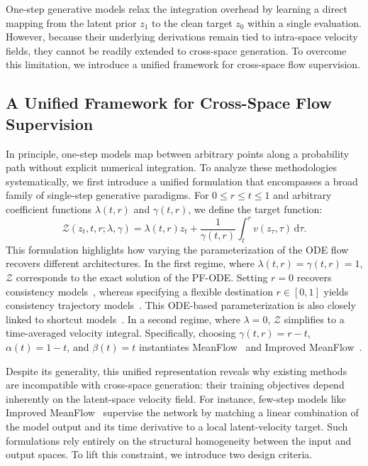 One-step generative models relax the integration overhead by learning a direct mapping from the latent prior $z_1$ to the clean target $z_0$ within a single evaluation. However, because their underlying derivations remain tied to intra-space velocity fields, they cannot be readily extended to cross-space generation. To overcome this limitation, we introduce a unified framework for cross-space flow supervision.

\subsection{A Unified Framework for Cross-Space Flow Supervision}

In principle, one-step models map between arbitrary points along a probability path without explicit numerical integration. To analyze these methodologies systematically, we first introduce a unified formulation that encompasses a broad family of single-step generative paradigms. For $0 \le r \le t \le 1$ and arbitrary coefficient functions $\lambda(t, r)$ and $\gamma(t, r)$, we define the target function:
\begin{equation}
\mathcal{Z}(z_t, t, r; \lambda, \gamma) = \lambda(t, r) z_t + \frac{1}{\gamma(t, r)} \int_{t}^{r} v(z_\tau, \tau)\,\mathrm{d}\tau.
\label{eq:general_z}
\end{equation}
This formulation highlights how varying the parameterization of the ODE flow recovers different architectures. In the first regime, where $\lambda(t, r)=\gamma(t, r)=1$, $\mathcal{Z}$ corresponds to the exact solution of the PF-ODE. Setting $r=0$ recovers consistency models~\citep{CM,ICT}, whereas specifying a flexible destination $r \in [0, 1]$ yields consistency trajectory models~\citep{CTM}. This ODE-based parameterization is also closely linked to shortcut models~\citep{shortcut}. In a second regime, where $\lambda=0$, $\mathcal{Z}$ simplifies to a time-averaged velocity integral. Specifically, choosing $\gamma(t, r)=r-t$, $\alpha(t)=1-t$, and $\beta(t)=t$ instantiates MeanFlow~\citep{meanflow} and Improved MeanFlow~\citep{imf}.

Despite its generality, this unified representation reveals why existing methods are incompatible with cross-space generation: their training objectives depend inherently on the latent-space velocity field. For instance, few-step models like Improved MeanFlow~\citep{imf} supervise the network by matching a linear combination of the model output and its time derivative to a local latent-velocity target. Such formulations rely entirely on the structural homogeneity between the input and output spaces. To lift this constraint, we introduce two design criteria.

